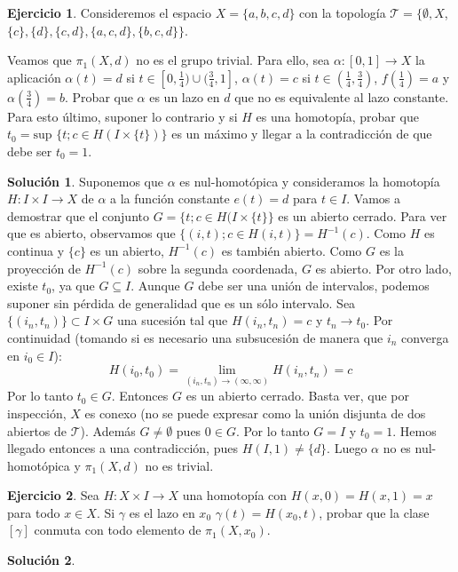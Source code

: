 \documentclass{article}
\theoremstyle{plain}
\theoremstyle{definition}
\newtheorem{exercise}{Ejercicio}
\newtheorem*{sol*}{Solución}
\begin{document}
\newpage \begin{exercise} Consideremos el espacio $X = \{a,b,c,d\}$ con la topología $\mathcal{T} = \{\emptyset, X$, $\{c\},\{d\}, \{c,d\}, \{a,c,d\}, \{b,c,d\}\}$.
\par
 Veamos que $\pi_1(X,d)$ no es el grupo trivial. Para ello, sea $\alpha: [0,1]\to X$ la aplicación $\alpha(t) = d$ si $t \in [0,\frac{1}{4}) \cup (\frac{3}{4},1]$, $\alpha(t) = c$ si $t\in (\frac{1}{4},\frac{3}{4})$, $f(\frac{1}{4}) = a$ y $\alpha(\frac{3}{4}) = b$.  Probar que $\alpha$ es un lazo en $d$ que no es equivalente al lazo constante. Para esto último, suponer lo contrario y si $H$ es una homotopía, probar que $t_0 = \mbox{sup }\{t; c\in H(I\times \{t\})\}$ es un máximo y llegar a la contradicción de que debe ser $t_0 = 1$.
\end{exercise}
\begin{sol*}
Suponemos que $\alpha$ es nul-homotópica y consideramos la homotopía $H : I \times I \to X$  de $\alpha$ a la función constante $e(t)=d$ para $t \in I$.
Vamos a demostrar que el conjunto $G = \{t ; c \in H(I \times \{t\}\}$ es un abierto cerrado. Para ver que es abierto, observamos que $\{(i,t) ; c \in H(i,t)\} = H^{-1}({c})$. Como $H$ es continua y $\{c\}$ es un abierto, $H^{-1}({c})$ es también abierto. Como $G$ es la proyección de $H^{-1}(c)$ sobre la segunda coordenada, $G$ es abierto. Por otro lado, existe $t_0$, ya que $G \subseteq I$. Aunque $G$ debe ser una unión de intervalos, podemos suponer sin pérdida de generalidad que es un sólo intervalo. Sea $\{(i_n,t_n)\}\subset I\times G$ una sucesión tal que $H(i_n,t_n) = c$ y $t_n \to t_0$. Por continuidad (tomando si es necesario una subsucesión de manera que $i_n$ converga en $i_0 \in I$):
\[ H(i_0,t_0) = \lim\limits_{(i_n,t_n)\to (\infty,\infty)}H(i_n,t_n) = c \]
Por lo tanto $t_0 \in G$. Entonces $G$ es un abierto cerrado. Basta ver, que por inspección, $X$ es conexo (no se puede expresar como la unión disjunta de dos abiertos de $\mathcal{T}$). Además $G\neq\emptyset$ pues $0\in G$. Por lo tanto $G = I$ y $t_0 = 1$. Hemos llegado entonces a una contradicción, pues $H(I,1) \neq \{d\}$. Luego $\alpha$ no es nul-homotópica y $\pi_1(X,d)$ no es trivial.
\end{sol*}

\newpage \begin{exercise} Sea $H: X\times I \to X$ una homotopía con $H(x,0) =  H(x,1) = x$ para todo $x\in X$. Si $\gamma$ es el lazo en $x_0$ $\gamma(t) = H(x_0,t)$, probar que la clase $[\gamma]$ conmuta con todo elemento de $\pi_1(X,x_0)$.
\end{exercise}
\begin{sol*} 

\end{sol*}
\end{document}
